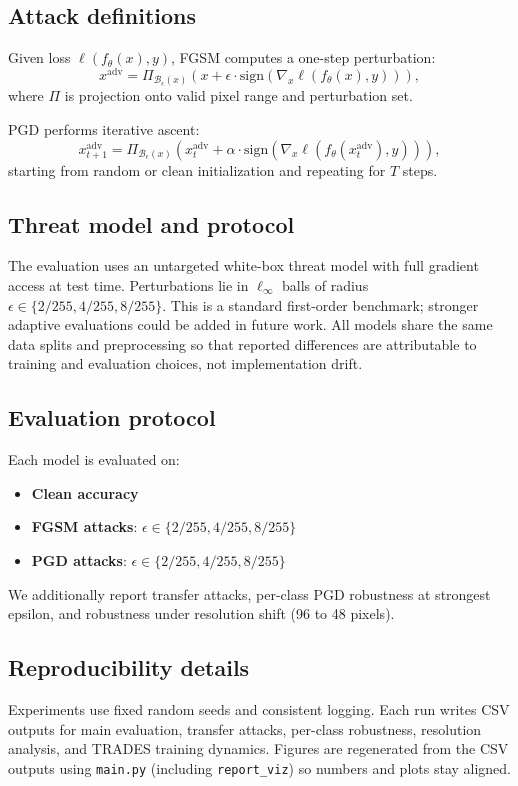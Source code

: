 \documentclass{article}
\begin{document}
\subsection{Attack definitions}
Given loss $\ell(f_\theta(x),y)$, FGSM computes a one-step perturbation:
\[
x^{\text{adv}} = \Pi_{\mathcal{B}_\epsilon(x)}\!\left(x + \epsilon \cdot \mathrm{sign}\!\left(\nabla_x \ell(f_\theta(x),y)\right)\right),
\]
where $\Pi$ is projection onto valid pixel range and perturbation set.

PGD performs iterative ascent:
\[
x_{t+1}^{\text{adv}} = \Pi_{\mathcal{B}_\epsilon(x)}\!\left(x_t^{\text{adv}} + \alpha \cdot \mathrm{sign}\!\left(\nabla_x \ell(f_\theta(x_t^{\text{adv}}),y)\right)\right),
\]
starting from random or clean initialization and repeating for $T$ steps.

\subsection{Threat model and protocol}
The evaluation uses an untargeted white-box threat model with full gradient access at test time. Perturbations lie in $\ell_\infty$ balls of radius $\epsilon\in\{2/255,4/255,8/255\}$. This is a standard first-order benchmark; stronger adaptive evaluations could be added in future work. All models share the same data splits and preprocessing so that reported differences are attributable to training and evaluation choices, not implementation drift.

\subsection{Evaluation protocol}
Each model is evaluated on:
\begin{itemize}
\item \textbf{Clean accuracy}
\item \textbf{FGSM attacks}: $\epsilon \in \{2/255,4/255,8/255\}$
\item \textbf{PGD attacks}: $\epsilon \in \{2/255,4/255,8/255\}$
\end{itemize}
We additionally report transfer attacks, per-class PGD robustness at strongest epsilon, and robustness under resolution shift (96 to 48 pixels).

\subsection{Reproducibility details}
Experiments use fixed random seeds and consistent logging. Each run writes CSV outputs for main evaluation, transfer attacks, per-class robustness, resolution analysis, and TRADES training dynamics. Figures are regenerated from the CSV outputs using \texttt{main.py} (including \texttt{report\_viz}) so numbers and plots stay aligned.
\end{document}
